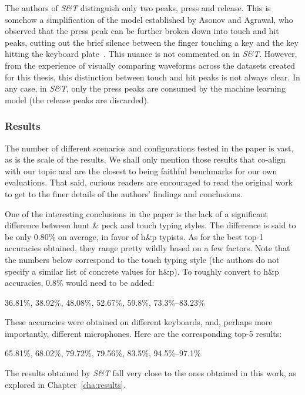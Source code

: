 \documentclass[../main.tex]{subfiles}
\begin{document}
The authors of \emph{S\&T} distinguish only two peaks, press and release. This is somehow a simplification of the model established by Asonov and Agrawal, who observed that the press peak can be further broken down into touch and hit peaks, cutting out the brief silence between the finger touching a key and the key hitting the keyboard plate~\cite{og2004}. This nuance is not commented on in \emph{S\&T}. However, from the experience of visually comparing waveforms across the datasets created for this thesis, this distinction between touch and hit peaks is not always clear. In any case, in \emph{S\&T}, only the press peaks are consumed by the machine learning model (the release peaks are discarded).

\subsubsection{Results}
The number of different scenarios and configurations tested in the paper is vast,
as is the scale of the results. We shall only mention those results that co-align with
our topic and are the closest to being faithful benchmarks for our own evaluations.
That said, curious readers are encouraged to read the original work to get to the
finer details of the authors' findings and conclusions.

One of the interesting conclusions in the paper is the lack of a significant difference
between hunt \& peck and touch typing styles. The difference is said to be only
0.80\% on average, in favor of h\&p typists. As for the best top-1 accuracies obtained,
they range pretty wildly based on a few factors. Note that the numbers below correspond
to the touch typing style (the authors do not specify a similar list of concrete values
for h\&p). To roughly convert to h\&p accuracies, 0.8\% would need to be added:
\begin{center}
    36.81\%, 38.92\%, 48.08\%, 52.67\%, 59.8\%, 73.3\%--83.23\%
\end{center}
These accuracies were obtained on different keyboards, and, perhaps more importantly,
different microphones. Here are the corresponding top-5 results:
\begin{center}
    65.81\%, 68.02\%, 79.72\%, 79.56\%, 83.5\%, 94.5\%--97.1\%
\end{center}

The results obtained by \emph{S\&T} fall very close to the ones obtained in this work,
as explored in Chapter~\ref{cha:results}.
\end{document}
